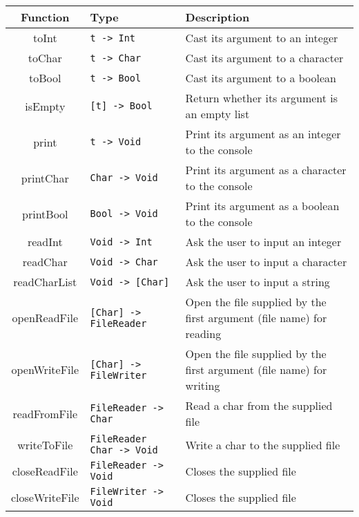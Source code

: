 \documentclass[a4paper]{article}
\begin{document}
\begin{tabular}{c | l | l}
  Function & Type & Description \\
  \hline
  toInt & {\tt t -> Int} & Cast its argument to an integer \\
  toChar & {\tt t -> Char} & Cast its argument to a character \\
  toBool & {\tt t -> Bool} & Cast its argument to a boolean \\
  isEmpty & {\tt [t] -> Bool} & Return whether its argument is an empty list \\
  print & {\tt t -> Void} & Print its argument as an integer to the console \\
  printChar & {\tt Char -> Void} & Print its argument as a character to the console \\
  printBool & {\tt Bool -> Void} & Print its argument as a boolean to the console \\
  readInt & {\tt Void -> Int} & Ask the user to input an integer \\
  readChar & {\tt Void -> Char} & Ask the user to input a character \\
  readCharList & {\tt Void -> [Char]} & Ask the user to input a string \\
  openReadFile & {\tt [Char] -> FileReader} & Open the file supplied by the first argument (file name) for reading \\
  openWriteFile & {\tt [Char] -> FileWriter} & Open the file supplied by the first argument (file name) for writing \\
  readFromFile & {\tt FileReader -> Char} & Read a char from the supplied file \\
  writeToFile & {\tt FileReader Char -> Void} & Write a char to the supplied file \\
  closeReadFile & {\tt FileReader -> Void} & Closes the supplied file \\
  closeWriteFile & {\tt FileWriter -> Void} & Closes the supplied file
\end{tabular}

\end{document}
